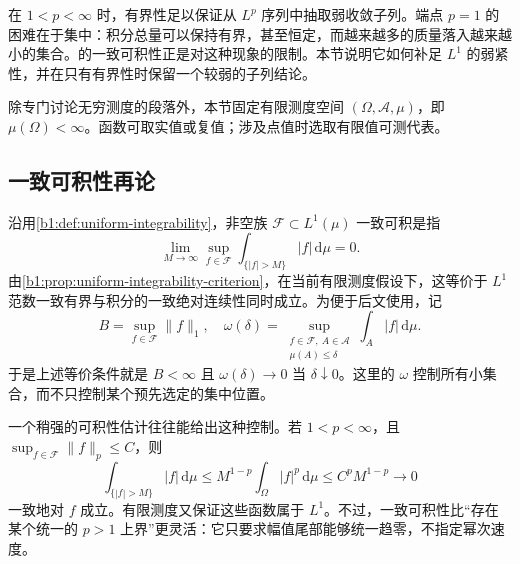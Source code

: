 
在 \(1<p<\infty\) 时，有界性足以保证从 \(L^p\) 序列中抽取弱收敛子列。端点 \(p=1\) 的困难在于集中：积分总量可以保持有界，甚至恒定，而越来越多的质量落入越来越小的集合。的一致可积性正是对这种现象的限制。本节说明它如何补足 \(L^1\) 的弱紧性，并在只有有界性时保留一个较弱的子列结论。

\ProseParagraphBreak

除专门讨论无穷测度的段落外，本节固定有限测度空间 \((\Omega,\mathcal A,\mu)\)，即 \(\mu(\Omega)<\infty\)。函数可取实值或复值；涉及点值时选取有限值可测代表。


\subsection{一致可积性再论}
\label{b1:subsec:100501}

沿用\cref{b1:def:uniform-integrability}，非空族 \(\mathcal F\subset L^1(\mu)\) 一致可积是指
\[
  \lim_{M\to\infty}\sup_{f\in\mathcal F}
  \int_{\{|f|>M\}}|f|\,\mathrm d\mu=0.
\]
由\cref{b1:prop:uniform-integrability-criterion}，在当前有限测度假设下，这等价于 \(L^1\) 范数一致有界与积分的一致绝对连续性同时成立。为便于后文使用，记
\[
  B=\sup_{f\in\mathcal F}\|f\|_1,
  \quad
  \omega(\delta)=\sup_{\substack{f\in\mathcal F,\ A\in\mathcal A\\
                               \mu(A)\leq\delta}}
                 \int_A|f|\,\mathrm d\mu.
\]
于是上述等价条件就是 \(B<\infty\) 且 \(\omega(\delta)\to0\) 当 \(\delta\downarrow0\)。这里的 \(\omega\) 控制所有小集合，而不只控制某个预先选定的集中位置。

\ProseParagraphBreak

一个稍强的可积性估计往往能给出这种控制。若 \(1<p<\infty\)，且 \(\sup_{f\in\mathcal F}\|f\|_p\leq C\)，则
\[
  \int_{\{|f|>M\}}|f|\,\mathrm d\mu
  \leq M^{1-p}\int_\Omega|f|^p\,\mathrm d\mu
  \leq C^pM^{1-p}\longrightarrow0
\]
一致地对 \(f\) 成立。有限测度又保证这些函数属于 \(L^1\)。不过，一致可积性比“存在某个统一的 \(p>1\) 上界”更灵活：它只要求幅值尾部能够统一趋零，不指定幂次速度。


